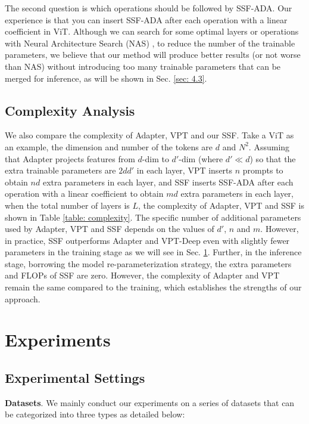 The second question is which operations should be followed by SSF-ADA. Our experience is that you can insert SSF-ADA after each operation with a linear coefficient in ViT. Although we can search for some optimal layers or operations with Neural Architecture Search (NAS) \cite{pham2018efficient, liu2018darts, guo2020single, lian2020iclr}, to reduce the number of the trainable parameters, we believe that our method will produce better results (or not worse than NAS) without introducing too many trainable parameters that can be merged for inference, as will be shown in Sec. \ref{sec: 4.3}.

\subsection{Complexity Analysis}\label{sec: 3.3}

We also compare the complexity of Adapter, VPT and our SSF. Take a ViT as an example, the dimension and number of the tokens are $d$ and $N^2$. Assuming that Adapter projects features from $d$-dim to $d'$-dim (where $d' \ll d$) so that the extra trainable parameters are $2dd'$ in each layer, VPT inserts $n$ prompts to obtain $nd$ extra parameters in each layer, and SSF inserts SSF-ADA after each operation with a linear coefficient to obtain $md$ extra parameters in each layer, when the total number of layers is $L$, the complexity of Adapter, VPT and SSF is shown in Table \ref{table: complexity}. The specific number of additional parameters used by Adapter, VPT and SSF depends on the values of $d'$, $n$ and $m$. However, in practice, SSF outperforms Adapter and VPT-Deep even with slightly fewer parameters in the training stage as we will see in Sec. \ref{sec: 4}. Further, in the inference stage, borrowing the model re-parameterization strategy, the extra parameters and FLOPs of SSF are zero. However, the complexity of Adapter and VPT remain the same compared to the training, which establishes the strengths of our approach. 

\section{Experiments}\label{sec: 4}

\subsection{Experimental Settings}\label{sec: 4.1}

\textbf{Datasets}.
We mainly conduct our experiments on a series of datasets that can be categorized into three types as detailed below:

